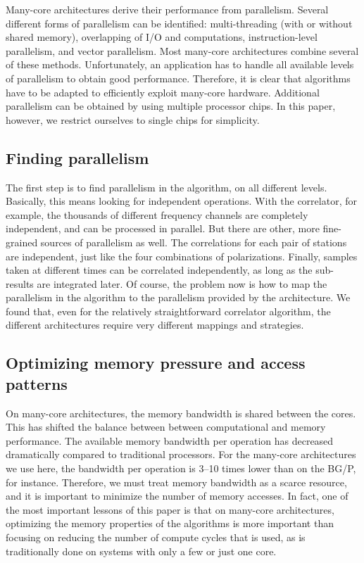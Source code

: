 \documentclass{article}
\begin{document}
Many-core architectures derive their performance from parallelism.
Several different forms of parallelism can be identified:
multi-threading (with or without shared memory), overlapping of I/O
and computations, instruction-level parallelism, and vector parallelism. Most
many-core architectures combine several of these methods.  
Unfortunately, an application has to handle all available levels of parallelism to
obtain good performance.
Therefore, it is clear that algorithms have to be adapted to efficiently exploit
many-core hardware.
Additional parallelism can be obtained by using multiple processor chips.
In this paper, however, we restrict ourselves to single chips for simplicity.



\subsection{Finding parallelism}

The first step is to find parallelism in the algorithm, on all
different levels.  Basically, this means looking for independent
operations.  With the correlator, for example, the thousands of
different frequency channels are completely independent, and can be
processed in parallel. But there are other, more fine-grained sources
of parallelism as well.  The correlations for each pair of stations
are independent, just like the four combinations of  
polarizations.  Finally, samples taken at different times can
be correlated independently, as long as the sub-results are integrated
later. Of course, the problem now is how to map the parallelism in the
algorithm to the parallelism provided by the architecture. We found
that, even for the relatively straightforward correlator algorithm,
the different architectures require very different mappings and
strategies.


\subsection{Optimizing memory pressure and access patterns}

On many-core architectures, the memory bandwidth is shared between the
cores.  This has shifted the balance between between computational and
memory performance.  The available memory bandwidth per operation has
decreased dramatically compared to traditional processors.  For the many-core architectures we use here,
the bandwidth per operation is 3--10 times lower than on the BG/P, for
instance.  Therefore, we must treat memory bandwidth as a scarce
resource, and it is important to minimize the number of memory
accesses.  In fact, one of the most important lessons of this paper is that on
many-core architectures, optimizing the memory properties of the
algorithms is more important than focusing on reducing the number of
compute cycles that is used, as is traditionally done on systems with
only a few or just one core.
\end{document}
